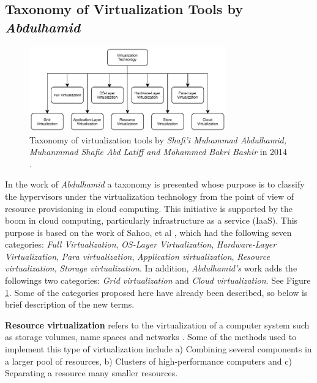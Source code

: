 	\subsection{Taxonomy of Virtualization Tools by \textit{Abdulhamid}}
	
	\begin{figure}[H]
		\centering
		\includegraphics[width=8.5cm]{images/Abdulhamid2014.pdf}
		\vspace{-0.2cm}
		\caption{Taxonomy of virtualization tools by \textit{Shafi'i Muhammad Abdulhamid, Muhanmmad Shafie Abd Latiff and Mohammed Bakri Bashir} in 2014 \cite{Abdulhamid2014}.}
		\label{fig:TaxonomyByAbdulhamid}
	\end{figure}
	
	In the work of \textit{Abdulhamid} \cite{Abdulhamid2014} a taxonomy is presented whose purpose is to classify the hypervisors under the virtualization technology from the point of view of resource provisioning in cloud computing. This initiative is supported by the boom in cloud computing, particularly infrastructure as a service (IaaS). This purpose is based on the work of Sahoo, et al \cite{Sahoo2010}, which had the following seven categories: \textit{ Full Virtualization}, \textit{OS-Layer Virtualization}, \textit{Hardware-Layer Virtualization}, \textit{Para virtualization}, \textit{Application virtualization}, \textit{Resource virtualization}, \textit{Storage virtualization}. In addition, \textit{Abdulhamid's} work adds the followings two categories: \textit{Grid virtualization} and \textit{Cloud virtualization}. See Figure \ref{fig:TaxonomyByAbdulhamid}. Some of the categories proposed here have already been described, so below is brief description of the new terms.  
	
	\textbf{Resource virtualization} refers to the virtualization of a computer system such as storage volumes, name spaces and networks \cite{Abdulhamid2014}.	Some of the methods used to implement this type of virtualization include a) Combining several components in a larger pool of resources, b) Clusters of high-performance computers and c) Separating a resource many smaller resources.
	
